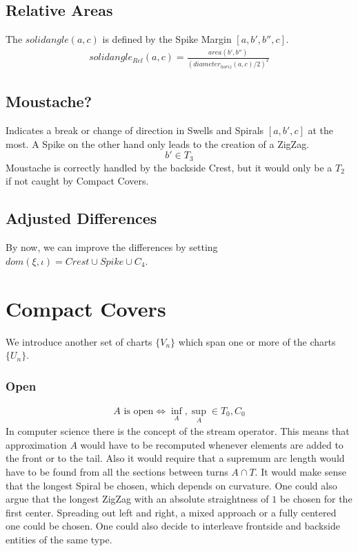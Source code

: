 \documentclass{report}
\begin{document}
\subsection{Relative Areas}
The $solidangle(a,c)$ is defined by the Spike Margin $[a,b',b'',c]$.
\begin{align}
solidangle_{Rel}(a,c) = \frac{area(b',b'')}{(diameter_{horiz}(a,c)/2)^2}
\end{align}

\subsection{Moustache?}
Indicates a break or change of direction in Swells and Spirals $[a,b',c]$ at the most. A Spike on the other hand only leads to the creation of a ZigZag.
\begin{equation}
b' \in T_{3}
\end{equation}
Moustache is correctly handled by the backside Crest, but it would only be a $T_{2}$ if not caught by Compact Covers.

\subsection*{Adjusted Differences}
By now, we can improve the differences by setting $dom(\xi,\iota)=Crest \cup Spike \cup C_{4}$.

\section{Compact Covers}
We introduce another set of charts $\{V_{n}\}$ which span one or more of the charts $\{U_{n}\}$.
\subsubsection*{Open}
\begin{align}
A \text{ is open} \Leftrightarrow \inf_{A},\sup_{A}\in T_{0},C_{0}
\end{align}
In computer science there is the concept of the stream operator. This means that approximation $A$ would have to be recomputed whenever elements are added to the front or to the tail. Also it would require that a supremum arc length would have to be found from all the sections between turns $A \cap T$. It would make sense that the longest Spiral be chosen, which depends on curvature. One could also argue that the longest ZigZag with an absolute straightness of $1$ be chosen for the first center. Spreading out left and right, a mixed approach or a fully centered one could be chosen. One could also decide to interleave frontside and backside entities of the same type.
\end{document}
